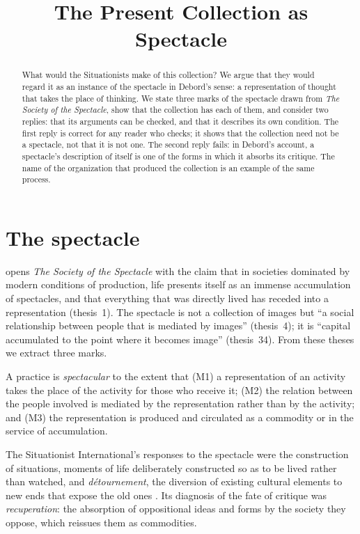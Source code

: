 \documentclass{situationist-preprint}
\title{The Present Collection as Spectacle}
\begin{document}
\maketitle

\begin{abstract}
What would the Situationists make of this collection? We argue that they would regard it as an instance of the spectacle in Debord's sense: a representation of thought that takes the place of thinking. We state three marks of the spectacle drawn from \emph{The Society of the Spectacle}, show that the collection has each of them, and consider two replies: that its arguments can be checked, and that it describes its own condition. The first reply is correct for any reader who checks; it shows that the collection need not be a spectacle, not that it is not one. The second reply fails: in Debord's account, a spectacle's description of itself is one of the forms in which it absorbs its critique. The name of the organization that produced the collection is an example of the same process.
\end{abstract}

\section{The spectacle}

\citet{Debord1967} opens \emph{The Society of the Spectacle} with the claim that in societies dominated by modern conditions of production, life presents itself as an immense accumulation of spectacles, and that everything that was directly lived has receded into a representation (thesis~1). The spectacle is not a collection of images but \enquote{a social relationship between people that is mediated by images} (thesis~4); it is \enquote{capital accumulated to the point where it becomes image} (thesis~34). From these theses we extract three marks.

\begin{definition}\label{d:marks}
A practice is \emph{spectacular} to the extent that (M1) a representation of an activity takes the place of the activity for those who receive it; (M2) the relation between the people involved is mediated by the representation rather than by the activity; and (M3) the representation is produced and circulated as a commodity or in the service of accumulation.
\end{definition}

The Situationist International's responses to the spectacle were the construction of situations, moments of life deliberately constructed so as to be lived rather than watched, and \emph{détournement}, the diversion of existing cultural elements to new ends that expose the old ones \citep{DebordWolman1956}. Its diagnosis of the fate of critique was \emph{recuperation}: the absorption of oppositional ideas and forms by the society they oppose, which reissues them as commodities.
\end{document}
